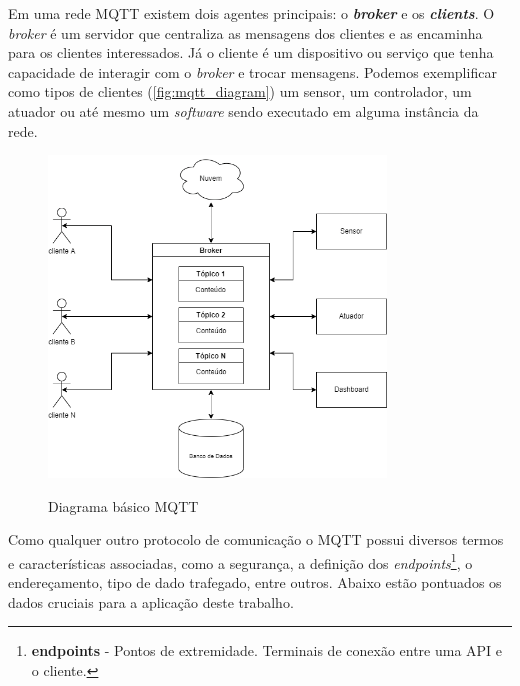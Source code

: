 Em uma rede MQTT existem dois agentes principais: o \textit{\textbf{broker}} e os \textit{\textbf{clients}}. O \textit{broker} é um servidor que centraliza as mensagens dos clientes e as encaminha para os clientes interessados. Já o cliente é um dispositivo ou serviço que tenha capacidade de interagir com o \textit{broker} e trocar mensagens. Podemos exemplificar como tipos de clientes (\autoref{fig:mqtt_diagram}) um sensor, um controlador, um atuador ou até mesmo um \textit{software} sendo executado em alguma instância da rede.

\begin{figure}[H]
	\centering
	\caption{Diagrama básico MQTT}
	\includegraphics[width=0.8\textwidth]{figuras/mqtt.drawio.png}
	\label{fig:mqtt_diagram}
\end{figure}

Como qualquer outro protocolo de comunicação o MQTT possui diversos termos e características associadas, como a segurança, a definição dos \textit{endpoints}\footnote{\textbf{endpoints} - Pontos de extremidade. Terminais de conexão entre uma API e o cliente.}, o endereçamento, tipo de dado trafegado, entre outros. Abaixo estão pontuados os dados cruciais para a aplicação deste trabalho.


